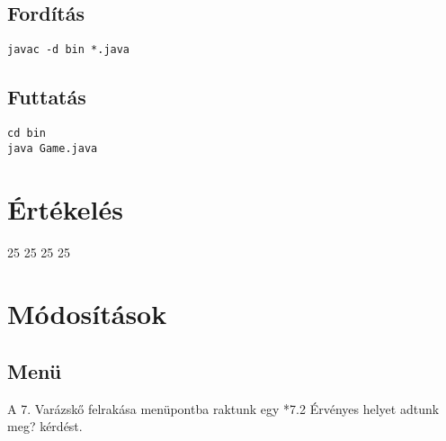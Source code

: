 \subsection{Fordítás}

\lstset{escapeinside=`', xleftmargin=10pt, frame=single, basicstyle=\ttfamily\footnotesize, language=sh}
\begin{lstlisting}
javac -d bin *.java
\end{lstlisting}

\subsection{Futtatás}

\lstset{escapeinside=`', xleftmargin=10pt, frame=single, basicstyle=\ttfamily\footnotesize, language=sh}
\begin{lstlisting}
cd bin
java Game.java
\end{lstlisting}

\section{Értékelés}

\begin{ertekeles}
{25}        %
{25}
{25}
{25}
\end{ertekeles}

\section{Módosítások}
\subsection{Menü}
A 7. Varázskő felrakása menüpontba raktunk egy *7.2 Érvényes helyet adtunk meg? kérdést.

